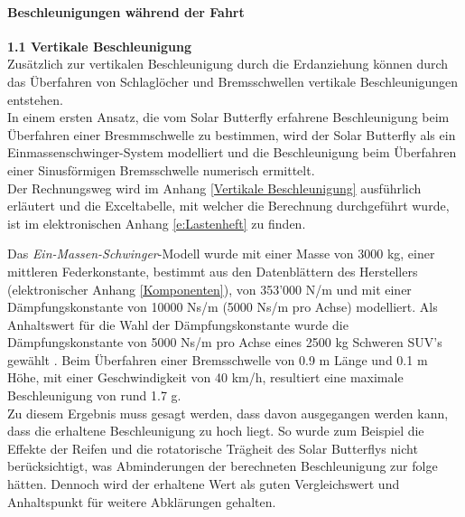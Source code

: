   \paragraph{Beschleunigungen während der Fahrt}
  \begin{description}
    \item \textbf{1.1 Vertikale Beschleunigung}\\
    Zusätzlich zur vertikalen Beschleunigung durch die Erdanziehung können durch das Überfahren von Schlaglöcher und Bremsschwellen vertikale Beschleunigungen entstehen.\\
    In einem ersten Ansatz, die vom Solar Butterfly erfahrene Beschleunigung beim Überfahren einer Bresmmschwelle zu bestimmen, wird der Solar Butterfly als ein Einmassenschwinger-System modelliert und die Beschleunigung beim Überfahren einer Sinusförmigen Bremsschwelle numerisch ermittelt.\\
    Der Rechnungsweg wird im Anhang \ref{Vertikale Beschleunigung} ausführlich erläutert und die Exceltabelle, mit welcher die Berechnung durchgeführt wurde, ist im elektronischen Anhang \ref{e:Lastenheft} zu finden.

    Das \emph{Ein-Massen-Schwinger}-Modell wurde mit einer Masse von 3000 kg, einer mittleren Federkonstante, bestimmt aus den Datenblättern des Herstellers (elektronischer Anhang \ref{Komponenten}), von 353'000 N/m und mit einer Dämpfungskonstante von 10000 Ns/m (5000 Ns/m pro Achse) modelliert. Als Anhaltswert für die Wahl der Dämpfungskonstante wurde die Dämpfungskonstante von 5000 Ns/m pro Achse eines 2500 kg Schweren SUV's gewählt \cite{Beschl.2}. Beim Überfahren einer Bremsschwelle von 0.9 m Länge und 0.1 m Höhe, mit einer Geschwindigkeit von 40 km/h, resultiert eine maximale Beschleunigung von rund 1.7 g.\\
    Zu diesem Ergebnis muss gesagt werden, dass davon ausgegangen werden kann, dass die erhaltene Beschleunigung zu hoch liegt. So wurde zum Beispiel die Effekte der Reifen und die rotatorische Trägheit des Solar Butterflys nicht berücksichtigt, was Abminderungen der berechneten Beschleunigung zur folge hätten. Dennoch wird der erhaltene Wert als guten Vergleichswert und Anhaltspunkt für weitere Abklärungen gehalten.


\end{description}
